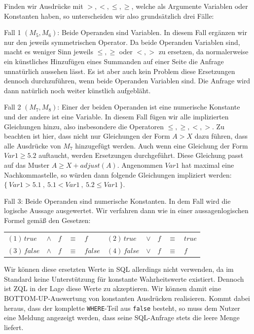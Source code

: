 Finden wir Ausdrücke mit $>,<,\leq,\geq$, welche als Argumente Variablen oder Konstanten haben, so unterscheiden wir also grundsätzlich drei Fälle:

Fall 1 $(M_5,M_6)$: Beide Operanden sind Variablen. In diesem Fall ergänzen wir nur den jeweils symmetrischen Operator. Da beide Operanden Variablen sind, macht es weniger Sinn jeweils $\leq,\geq$ oder $<,>$ zu ersetzen, da normalerweise ein künstliches Hinzufügen eines Summanden auf einer Seite die Anfrage unnatürlich aussehen lässt. Es ist aber auch kein Problem diese Ersetzungen dennoch durchzuführen, wenn beide Operanden Variablen sind. Die Anfrage wird dann natürlich noch weiter künstlich aufgebläht.

Fall 2 $(M_7,M_8)$: Einer der beiden Operanden ist eine numerische Konstante und der andere ist eine Variable. In diesem Fall fügen wir alle implizierten Gleichungen hinzu, also insbesondere die Operatoren $\leq,\geq,<,>$. Zu beachten ist hier, dass nicht nur Gleichungen der Form $A>X$ dazu führen, dass alle Ausdrücke von $M_7$ hinzugefügt werden. Auch wenn eine Gleichung der Form $Var1\geq 5.2$ auftaucht, werden Ersetzungen durchgeführt. Diese Gleichung passt auf das Muster $A\geq X+\mathit{adjust}(A)$. Angenommen $Var1$ hat maximal eine Nachkommastelle, so würden dann folgende Gleichungen impliziert werden: $\{\ Var1>5.1\ ,\ 5.1<Var1\ ,\ 5.2 \leq Var1\ \}$.

Fall 3: Beide Operanden sind numerische Konstanten. In dem Fall wird die logische Aussage ausgewertet. Wir verfahren dann wie in einer aussagenlogischen Formel gemäß den Gesetzen: 
\begin{center}
\begin{tabular}{lclcllclcl}
$(1)\,true $ & $\wedge$ & $ f$ & $\equiv$ & $ f$ & $(2)\,true $ & $\vee$ & $ f$ & $\equiv$ & $true$\\
$(3)\,false $ & $\wedge$ & $ f$ & $\equiv$ & $false$ & $(4)\,false $ & $\vee$ & $ f$ & $\equiv$ & $f$\\
\end{tabular}
\end{center}

Wir können diese ersetzten Werte in SQL allerdings nicht verwenden, da im Standard keine Unterstützung für konstante Wahrheitswerte existiert. Dennoch ist ZQL in der Lage diese Werte zu akzeptieren. Wir können damit eine BOTTOM-UP-Auswertung von konstanten Ausdrücken realisieren. Kommt dabei heraus, dass der komplette \verb|WHERE|-Teil aus \verb|false| besteht, so muss dem Nutzer eine Meldung angezeigt werden, dass seine SQL-Anfrage stets die leere Menge liefert.

